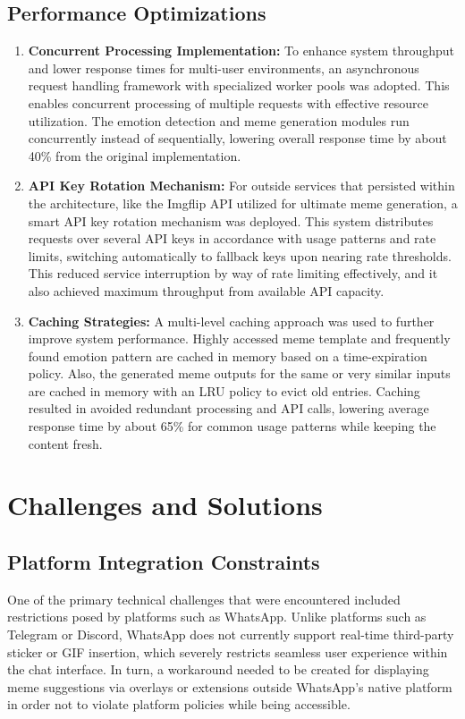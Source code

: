 \documentclass[conference]{IEEEtran}
\begin{document}
\subsection{Performance Optimizations}
\begin{enumerate}
    \item \textbf{Concurrent Processing Implementation:} To enhance system throughput and lower response times for multi-user environments, an asynchronous request handling framework with specialized worker pools was adopted. This enables concurrent processing of multiple requests with effective resource utilization. The emotion detection and meme generation modules run concurrently instead of sequentially, lowering overall response time by about 40\% from the original implementation.
    \item \textbf{API Key Rotation Mechanism:} For outside services that persisted within the architecture, like the Imgflip API utilized for ultimate meme generation, a smart API key rotation mechanism was deployed. This system distributes requests over several API keys in accordance with usage patterns and rate limits, switching automatically to fallback keys upon nearing rate thresholds. This reduced service interruption by way of rate limiting effectively, and it also achieved maximum throughput from available API capacity.
    \item \textbf{Caching Strategies:} A multi-level caching approach was used to further improve system performance. Highly accessed meme template and frequently found emotion pattern are cached in memory based on a time-expiration policy. Also, the generated meme outputs for the same or very similar inputs are cached in memory with an LRU policy to evict old entries. Caching resulted in avoided redundant processing and API calls, lowering average response time by about 65\% for common usage patterns while keeping the content fresh.
\end{enumerate}

%

\section{Challenges and Solutions}
\subsection{Platform Integration Constraints}
One of the primary technical challenges that were encountered included restrictions posed by platforms such as WhatsApp. Unlike platforms such as Telegram or Discord, WhatsApp does not currently support real-time third-party sticker or GIF insertion, which severely restricts seamless user experience within the chat interface. In turn, a workaround needed to be created for displaying meme suggestions via overlays or extensions outside WhatsApp’s native platform in order not to violate platform policies while being accessible.
\end{document}
